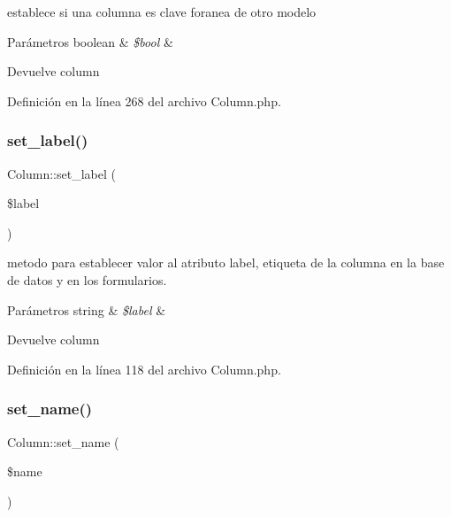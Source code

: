 establece si una columna es clave foranea de otro modelo


\begin{DoxyParams}[1]{Parámetros}
boolean & {\em \$bool} & \\
\hline
\end{DoxyParams}
\begin{DoxyReturn}{Devuelve}
column 
\end{DoxyReturn}


Definición en la línea 268 del archivo Column.\+php.

\mbox{\label{class_column_ac17cbac2309c3ab456b818d7be33b2e7}} 
\subsubsection{\texorpdfstring{set\_label()}{set\_label()}}
{\footnotesize\ttfamily Column\+::set\+\_\+label (\begin{DoxyParamCaption}\item[{}]{\$label }\end{DoxyParamCaption})}

metodo para establecer valor al atributo label, etiqueta de la columna en la base de datos y en los formularios.


\begin{DoxyParams}[1]{Parámetros}
string & {\em \$label} & \\
\hline
\end{DoxyParams}
\begin{DoxyReturn}{Devuelve}
column 
\end{DoxyReturn}


Definición en la línea 118 del archivo Column.\+php.

\mbox{\label{class_column_adb76436490cc4941cfd8ded9336f3321}} 
\subsubsection{\texorpdfstring{set\_name()}{set\_name()}}
{\footnotesize\ttfamily Column\+::set\+\_\+name (\begin{DoxyParamCaption}\item[{}]{\$name }\end{DoxyParamCaption})}

